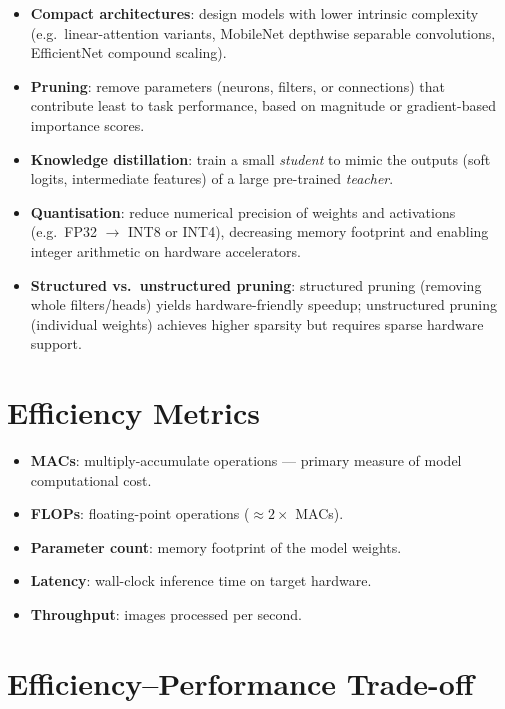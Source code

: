 \documentclass[12pt,a4paper]{report}
\begin{document}
\begin{itemize}[itemsep=2pt]
    \item \textbf{Compact architectures}: design models with lower intrinsic
          complexity (e.g.\ linear-attention variants, MobileNet depthwise
          separable convolutions, EfficientNet compound scaling).
    \item \textbf{Pruning}: remove parameters (neurons, filters, or
          connections) that contribute least to task performance, based on
          magnitude or gradient-based importance scores.
    \item \textbf{Knowledge distillation}: train a small \emph{student} to
          mimic the outputs (soft logits, intermediate features) of a large
          pre-trained \emph{teacher}.
    \item \textbf{Quantisation}: reduce numerical precision of weights and
          activations (e.g.\ FP32 $\to$ INT8 or INT4), decreasing memory
          footprint and enabling integer arithmetic on hardware accelerators.
    \item \textbf{Structured vs.\ unstructured pruning}: structured pruning
          (removing whole filters/heads) yields hardware-friendly speedup;
          unstructured pruning (individual weights) achieves higher sparsity
          but requires sparse hardware support.
\end{itemize}

\section{Efficiency Metrics}

\begin{itemize}[itemsep=1pt]
    \item \textbf{MACs}: multiply-accumulate operations — primary measure of
          model computational cost.
    \item \textbf{FLOPs}: floating-point operations ($\approx 2\times$ MACs).
    \item \textbf{Parameter count}: memory footprint of the model weights.
    \item \textbf{Latency}: wall-clock inference time on target hardware.
    \item \textbf{Throughput}: images processed per second.
\end{itemize}

\section{Efficiency--Performance Trade-off}
\end{document}
